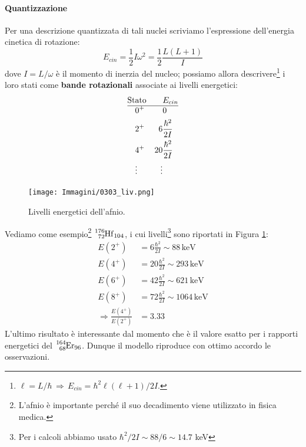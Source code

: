 \paragraph{Quantizzazione} Per una descrizione quantizzata di tali nuclei scriviamo l'espressione dell'energia cinetica di rotazione:
$$E_{cin} = \frac{1}{2} I \omega^2=\frac{1}{2}\frac{L(L+1)}{I}$$
dove $I=L/\omega$ è il momento di inerzia del nucleo; possiamo allora descrivere\footnote{$\ell = L/\hbar\,\Rightarrow\, E_{cin} = \hbar^2\ell(\ell+1)/2I$.} i loro stati come \textbf{bande rotazionali} associate ai livelli energetici:
\begin{displaymath}
\begin{aligned}
\text{St}&\text{ato} & &E_{cin} \\
\hline
&0^+ & &0 \\
&2^+ & 6&\frac{\hbar^2}{2I} \\
&4^+ & 20&\frac{\hbar^2}{2I} \\
&\vdots & \vdots&
\end{aligned}
\end{displaymath}
\begin{figure}[h]
    \centering
    \texttt{[image: Immagini/0303\_liv.png]}
    \caption{Livelli energetici dell'afnio.}
    \label{0303_livel}
\end{figure}
\noindent Vediamo come esempio\footnote{L'afnio è importante perché il suo decadimento viene utilizzato in fisica medica.} $\ce{^{176}_{72}Hf_{104}}$, i cui livelli\footnote{Per i calcoli abbiamo usato $\hbar^2/2I \sim 88/6 \sim 14.7$ keV} sono riportati in Figura \ref{0303_livel}:
\begin{displaymath}
\begin{aligned}
E(2^+)&= 6\frac{\hbar^2}{2I}\sim 88\, \mbox{keV} \\
E(4^+)&= 20\frac{\hbar^2}{2I}\sim 293\, \mbox{keV} \\
E(6^+)&= 42\frac{\hbar^2}{2I}\sim 621\, \mbox{keV} \\
E(8^+)&= 72\frac{\hbar^2}{2I}\sim 1064\, \mbox{keV} \\
\Rightarrow \frac{E(4^+)}{E(2^+)}&= 3.33
\end{aligned}
\end{displaymath}
L'ultimo risultato è interessante dal momento che è il valore esatto per i rapporti energetici del $\ce{^{164}_{68}Er_{96}}$. Dunque il modello riproduce con ottimo accordo le osservazioni.


